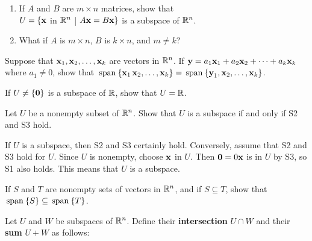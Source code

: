 \begin{multicols}{2}
\begin{ex}
\begin{sol}
\begin{enumerate}[label={\alph*.}]
\end{enumerate}
\end{sol}
\end{ex}

\begin{ex}
\begin{enumerate}[label={\alph*.}]
\item If $A$ and $B$ are $m \times n$ matrices, show that \\$U = \{\textbf{x}$ in $\mathbb{R}^n$ | $A\textbf{x} = B\textbf{x}\}$ is a subspace of $\mathbb{R}^n$.

\item What if $A$ is $m \times n$, $B$ is $k \times n$, and $m \neq k$?

\end{enumerate}
\end{ex}

\begin{ex}
Suppose that $\textbf{x}_{1}, \textbf{x}_{2}, \dots, \textbf{x}_{k}$ are vectors in $\mathbb{R}^n$. If $\textbf{y} = a_{1}\textbf{x}_{1} + a_{2}\textbf{x}_{2} + \dots + a_{k}\textbf{x}_{k}$ where $a_{1} \neq 0$, show that $\thinspace\operatorname{span\medspace}\{\textbf{x}_{1}\, \textbf{x}_{2}, \dots, \textbf{x}_{k}\} = \thinspace\operatorname{span\medspace}\{\textbf{y}_{1}, \textbf{x}_{2}, \dots, \textbf{x}_{k}\}$.
\end{ex}

\begin{ex}
If $U \neq \{\textbf{0}\}$ is a subspace of $\mathbb{R}$, show that $U = \mathbb{R}$.
\end{ex}

\begin{ex}\label{ex:5_1_20}
Let $U$ be a nonempty subset of $\mathbb{R}^n$. Show that $U$ is a subspace if and only if S2 and S3 hold.

\begin{sol}
If $U$ is a subspace, then S2 and S3 certainly hold. Conversely, assume that S2 and S3 hold for $U$. Since $U$ is nonempty, choose $\textbf{x}$ in $U$. Then $\textbf{0} = 0\textbf{x}$ is in $U$ by S3, so S1 also holds. This means that $U$ is a subspace.
\end{sol}
\end{ex}

\begin{ex}
If $S$ and $T$ are nonempty sets of vectors in $\mathbb{R}^n$, and if $S \subseteq T$, show that $\thinspace\operatorname{span\medspace}\{S\} \subseteq \thinspace\operatorname{span\medspace}\{T\}$.
\end{ex}

\begin{ex}\label{ex:5_1_22}
Let $U$ and $W$ be subspaces of $\mathbb{R}^n$. Define their \textbf{intersection} $U \cap W$ and their \textbf{sum} $U + W$ as follows:


\end{ex}
\end{multicols}
